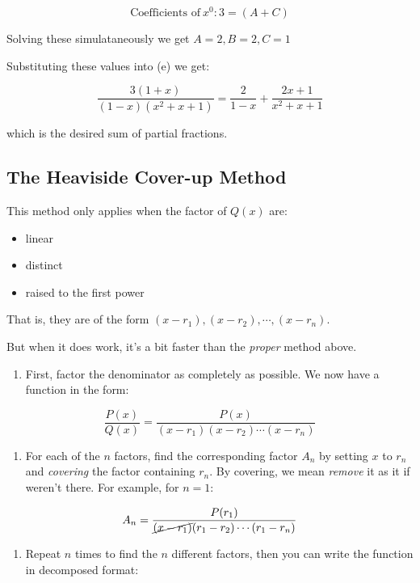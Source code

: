 \documentclass{article}
\begin{document}
\[ \text{Coefficients of}~x^0: 3 = (A+C) \]

Solving these simulataneously we get $A=2, B=2, C=1$

Substituting these values into (e) we get:

\[ \tag{k} \frac{3(1+x)}{(1-x)(x^2+x+1)} = \frac{2}{1-x} + \frac{2x + 1}{x^2+x+1} \]

which is the desired sum of partial fractions.

\subsection{The Heaviside Cover-up Method}

This method only applies when the factor of $Q(x)$ are:

\begin{itemize}
\item linear
\item distinct
\item raised to the first power
\end{itemize}

That is, they are of the form $(x-r_1),(x-r_2),\cdots,(x-r_n)$.

But when it does work, it's a bit faster than the \emph{proper} method above.

\begin{enumerate}
\item First, factor the denominator as completely as possible. We now have a function in the form:
\end{enumerate}

\[ \frac{P(x)}{Q(x)} = \frac{P(x)}{(x-r_1)(x-r_2)\cdots(x-r_n)} \]

\begin{enumerate}
\item For each of the $n$ factors, find the corresponding factor $A_n$ by setting $x$ to $r_n$ and \emph{covering} the factor containing $r_n$. By covering, we mean \emph{remove} it as it if weren't there. For example, for $n = 1$:
\end{enumerate}

\[ A_n = \frac{P(r_1)}{\cancel{(x-r_1)}(r_1-r_2)\cdots(r_1-r_n)} \]

\begin{enumerate}
\item Repeat $n$ times to find the $n$ different factors, then you can write the function in decomposed format:
\end{enumerate}
\end{document}
